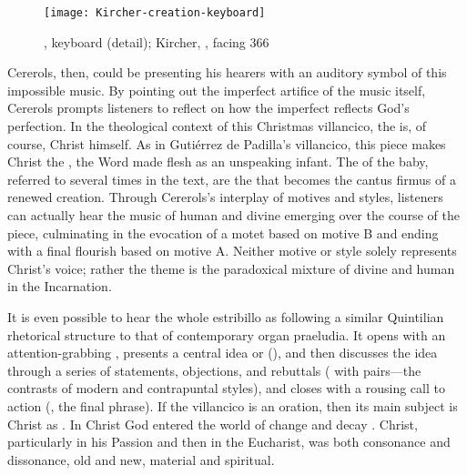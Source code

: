 \begin{figure}
    \caption{, keyboard (detail); Kircher,
    , facing 366}
    \label{fig:Kircher-creation-keyboard}
    \texttt{[image: Kircher-creation-keyboard]}
\end{figure}

Cererols, then, could be presenting his hearers with an auditory symbol of this
impossible music.
By pointing out the imperfect artifice of the music itself, Cererols prompts
listeners to reflect on how the imperfect reflects God's perfection.
In the theological context of this Christmas villancico, the  is, of course, Christ himself.
As in Gutiérrez de Padilla's villancico, this piece makes Christ the
, the Word made flesh as an unspeaking infant.
The  of the baby, referred to several times in the text, are the
 that becomes the cantus firmus of a renewed creation.
Through Cererols's interplay of motives and styles, listeners can actually hear
the music of human and divine emerging over the course of the piece,
culminating in the evocation of a motet based on motive B and ending with a
final flourish based on motive A.
Neither motive or style solely represents Christ's voice; rather the theme is
the paradoxical mixture of divine and human in the Incarnation.


It is even possible to hear the whole estribillo as following a similar
Quintilian rhetorical structure to that of contemporary organ praeludia.%
    \Autocite{Jacobson:BuxtehudeRhetoric}
It opens with an attention-grabbing , presents a central idea or
 (), and then discusses the
idea through a series of statements, objections, and rebuttals (
with  pairs---the contrasts of modern and
contrapuntal styles), and closes with a rousing call to action
(, the final phrase).
If the villancico is an oration, then its main subject is Christ as .
In Christ God entered the world of change and decay .
Christ, particularly in his Passion and then in the Eucharist, was both
consonance and dissonance, old and new, material and spiritual.


